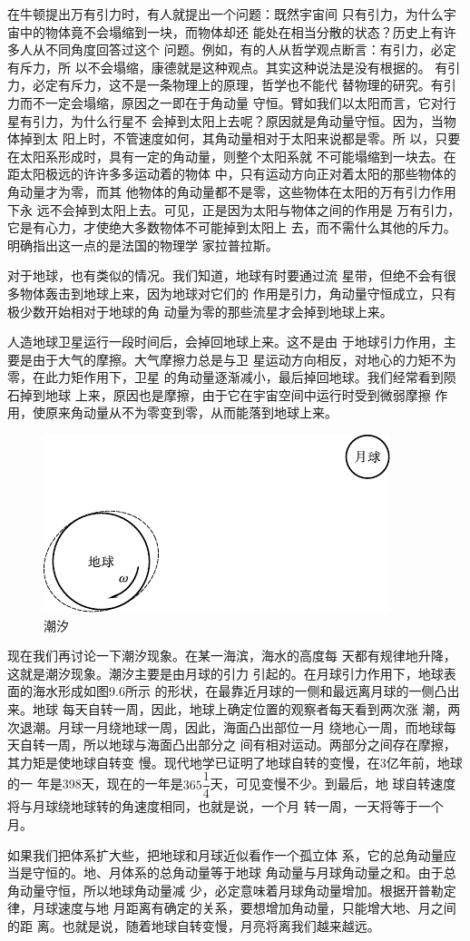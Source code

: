 在牛顿提出万有引力时，有人就提出一个问题：既然宇宙间
只有引力，为什么宇宙中的物体竟不会塌缩到一块，而物体却还
能处在相当分散的状态？历史上有许多人从不同角度回答过这个
问题。例如，有的人从哲学观点断言：有引力，必定有斥力，所
以不会塌缩，康德就是这种观点。其实这种说法是没有根据的。
有引力，必定有斥力，这不是一条物理上的原理，哲学也不能代
替物理的研究。有引力而不一定会塌缩，原因之一即在于角动量
守恒。臂如我们以太阳而言，它对行星有引力，为什么行星不
会掉到太阳上去呢？原因就是角动量守恒。因为，当物体掉到太
阳上时，不管速度如何，其角动量相对于太阳来说都是零。所
以，只要在太阳系形成时，具有一定的角动量，则整个太阳系就
不可能塌缩到一块去。在距太阳极远的许许多多运动着的物体
中，只有运动方向正对着太阳的那些物体的角动量才为零，而其
他物体的角动量都不是零，这些物体在太阳的万有引力作用下永
远不会掉到太阳上去。可见，正是因为太阳与物体之间的作用是
万有引力，它是有心力，才使绝大多数物体不可能掉到太阳上
去，而不需什么其他的斥力。明确指出这一点的是法国的物理学
家拉普拉斯。

对于地球，也有类似的情况。我们知道，地球有时要通过流
星带，但绝不会有很多物体轰击到地球上来，因为地球对它们的
作用是引力，角动量守恒成立，只有极少数开始相对于地球的角
动量为零的那些流星才会掉到地球上来。

人造地球卫星运行一段时间后，会掉回地球上来。这不是由
于地球引力作用，主要是由于大气的摩擦。大气摩擦力总是与卫
星运动方向相反，对地心的力矩不为零，在此力矩作用下，卫星
的角动量逐渐减小，最后掉回地球。我们经常看到陨石掉到地球
上来，原因也是摩擦，由于它在宇宙空间中运行时受到微弱摩擦
作用，使原来角动量从不为零变到零，从而能落到地球上来。
\begin{figure}[h]
  \centering
  \includegraphics{figure/fig09.06}
  \caption{潮汐}
  \label{fig:09.06}
\end{figure}

现在我们再讨论一下潮汐现象。在某一海滨，海水的高度每
天都有规律地升降，这就是潮汐现象。潮汐主要是由月球的引力
引起的。在月球引力作用下，地球表面的海水形成如图9.6所示
的形状，在最靠近月球的一侧和最远离月球的一侧凸出来。地球
每天自转一周，因此，地球上确定位置的观察者每天看到两次涨
潮，两次退潮。月球一月绕地球一周，因此，海面凸出部位一月
绕地心一周，而地球每天自转一周，所以地球与海面凸出部分之
间有相对运动。两部分之间存在摩擦，其力矩是使地球自转变
慢。现代地学已证明了地球自转的变慢，在3亿年前，地球的一
年是398天，现在的一年是$ 3 6 5 \dfrac { 1 } { 4 } $天，可见变慢不少。到最后，地
球自转速度将与月球绕地球转的角速度相同，也就是说，一个月
转一周，一天将等于一个月。

如果我们把体系扩大些，把地球和月球近似看作一个孤立体
系，它的总角动量应当是守恒的。地、月体系的总角动量等于地球
角动量与月球角动量之和。由于总角动量守恒，所以地球角动量减
少，必定意味着月球角动量增加。根据开普勒定律，月球速度与地
月距离有确定的关系，要想增加角动量，只能增大地、月之间的距
离。也就是说，随着地球自转变慢，月亮将离我们越来越远。
